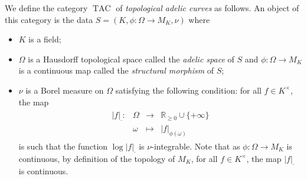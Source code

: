 \documentclass [11pt,reqno]{amsart}
\def\bR{{\mathbb{R}}}
\newcommand{\1}{\mathmybb{1}}
\def\TAC{\operatorname{TAC}}
\newcommand{\fonction}[5]{\begin{array}{l|rcl}
#1: & #2 & \longrightarrow & #3 \\
    & #4 & \longmapsto & #5 \end{array}}
\begin{document}
\begin{definition}
\label{def:topological_adelic_curve}
We define the category $\TAC$ of \emph{topological adelic curves} as follows. An object of this category is the data $S=(K,\phi:\Omega\to M_K,\nu)$ where
\begin{itemize}
	\item $K$ is a field; 
	\item $\Omega$ is a Hausdorff topological space called the \emph{adelic space} of $S$ and $\phi:\Omega\to M_K$ is a continuous map called the \emph{structural morphism} of $S$;
	\item $\nu$ is a Borel measure on $\Omega$ satisfying the following condition: for all $f\in K^{\times}$, the map
	\begin{align*}
	\fonction{|f|_{\cdot}}{\Omega}{\bR_{\geq 0} \cup \{+\infty\}}{\omega}{|f|_{\phi(\omega)}}
	\end{align*}
is such that the function $\log|f|_{\cdot}$ is $\nu$-integrable. Note that as $\phi : \Omega \to M_{K}$ is continuous, by definition of the topology of $M_K$, for all $f\in K^{\times}$, the map $|f|_{\cdot}$ is continuous.
\end{itemize}


\end{definition}
\end{document}
